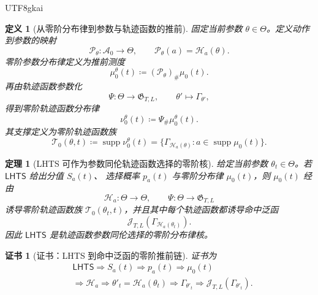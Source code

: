 \documentclass[12pt]{article}
\newtheorem{definition}{定义}[section]
\newtheorem{theorem}{定理}[section]
\newtheorem{Certificate}{证书}[section]
\newcommand{\LHTS}{\ensuremath{\mathsf{LHTS}}}
\newcommand{\DefEq}{\coloneqq}
\DeclareMathOperator{\supp}{supp}
\begin{document}
\begin{CJK*}{UTF8}{gkai}
\begin{definition}[从零阶分布律到参数与轨迹函数的推前]
\label{def:tex57-pushforward-zero-law}
固定当前参数 \(\theta\in\Theta\)。定义动作到参数的映射
\[
  \mathcal P_\theta:\mathcal A_0\to\Theta,
  \qquad
  \mathcal P_\theta(a)=\mathscr H_a(\theta).
\]
零阶参数分布律定义为推前测度
\[
  \mu_0^\theta(t)
  \DefEq
  (\mathcal P_\theta)_\#\mu_0(t).
\]
再由轨迹函数参数化
\[
  \Psi:\Theta\to\mathfrak G_{T,L},
  \qquad
  \theta'\mapsto\Gamma_{\theta'},
\]
得到零阶轨迹函数分布律
\[
  \nu_0^\theta(t)
  \DefEq
  \Psi_\#\mu_0^\theta(t).
\]
其支撑定义为零阶轨迹函数族
\[
  \mathcal T_0(\theta,t)
  \DefEq
  \supp\nu_0^\theta(t)
  =
  \{\Gamma_{\mathscr H_a(\theta)}:a\in\supp\mu_0(t)\}.
\]
\end{definition}

\begin{theorem}[LHTS 可作为参数同伦轨迹函数选择的零阶核]
\label{thm:tex57-lhts-zero-kernel}
给定当前参数 \(\theta_t\in\Theta\)。若 \(\LHTS{}\) 给出分值 \(S_a(t)\)、
选择概率 \(p_a(t)\) 与零阶分布律 \(\mu_0(t)\)，则 \(\mu_0(t)\) 经由
\[
  \mathscr H_a:\Theta\to\Theta,
  \qquad
  \Psi:\Theta\to\mathfrak G_{T,L}
\]
诱导零阶轨迹函数族 \(\mathcal T_0(\theta_t,t)\)，并且其中每个轨迹函数都诱导命中泛函
\[
  \mathcal J_{T,L}(\Gamma_{\mathscr H_a(\theta_t)}).
\]
因此 \(\LHTS{}\) 是轨迹函数参数同伦选择的零阶分布律核。
\end{theorem}

\begin{Certificate}[证书：LHTS 到命中泛函的零阶推前链]
\label{cert:tex57-lhts-zero-kernel}
证书为
\[
\begin{aligned}
&\LHTS{}
\Longrightarrow
S_a(t)
\Longrightarrow
p_a(t)
\Longrightarrow
\mu_0(t)\\
&\Longrightarrow
\mathscr H_a
\Longrightarrow
\theta'_t=\mathscr H_a(\theta_t)
\Longrightarrow
\Gamma_{\theta'_t}
\Longrightarrow
\mathcal J_{T,L}(\Gamma_{\theta'_t}).
\end{aligned}
\]
\end{Certificate}


\end{CJK*}
\end{document}
